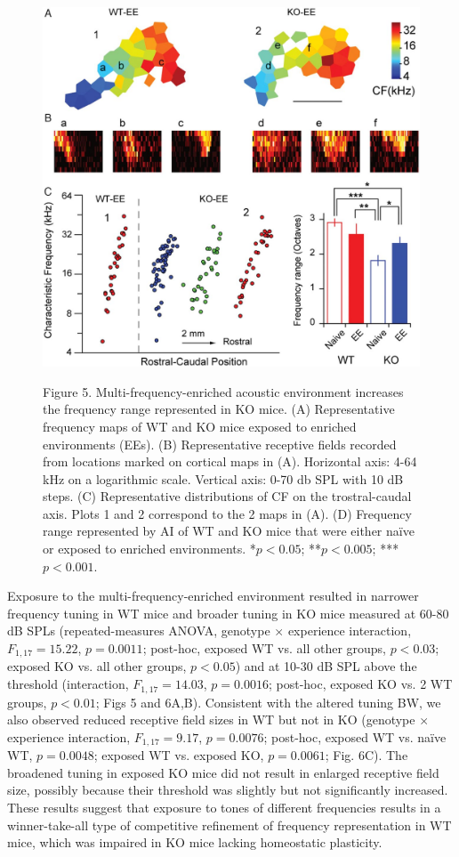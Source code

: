 \begin{figure}[h]
	\centering
		\includegraphics[width=5in]{images/C3F5}
	\begin{changemargin}{1in}{1in}
	\footnotesize{Figure 5. Multi-frequency-enriched acoustic environment increases the frequency range represented in KO mice. (A) Representative frequency maps of WT and KO mice exposed to enriched environments (EEs). (B) Representative receptive fields recorded from locations marked on cortical maps in (A). Horizontal axis: 4-64 kHz on a logarithmic scale. Vertical axis: 0-70 db SPL with 10 dB steps. (C) Representative distributions of CF on the trostral-caudal axis. Plots 1 and 2 correspond to the 2 maps in (A). (D) Frequency range represented by AI of WT and KO mice that were either na\"ive or exposed to enriched environments. *$p<0.05$; **$p<0.005$; ***$p<0.001$.}
	\end{changemargin}
\end{figure}

Exposure to the multi-frequency-enriched environment resulted in narrower frequency tuning in WT mice and broader tuning in KO mice measured at 60-80 dB SPLs (repeated-measures ANOVA, genotype $\times$ experience interaction, $F_{1,17}=15.22$, $p=0.0011$; post-hoc, exposed WT vs. all other groups, $p<0.03$; exposed KO vs. all other groups, $p<0.05$) and at 10-30 dB SPL above the threshold (interaction, $F_{1,17}=14.03$, $p=0.0016$; post-hoc, exposed KO vs. 2 WT groups, $p<0.01$; Figs 5 and 6A,B). Consistent with the altered tuning BW, we also observed reduced receptive field sizes in WT but not in KO (genotype $\times$ experience interaction, $F_{1,17}=9.17$, $p=0.0076$; post-hoc, exposed WT vs. na\"ive WT, $p=0.0048$; exposed WT vs. exposed KO, $p=0.0061$; Fig. 6C). The broadened tuning in exposed KO mice did not result in enlarged receptive field size, possibly because their threshold was slightly but not significantly increased. These results suggest that exposure to tones of different frequencies results in a winner-take-all type of competitive refinement of frequency representation in WT mice, which was impaired in KO mice lacking homeostatic plasticity.

